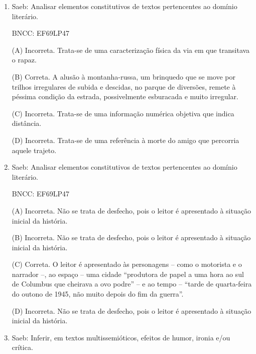 \begin{enumerate}
(B) Incorreta. Não há efeito humorístico no texto.

(C) Correta. A expressão ``mostre a língua'' apresenta o sentido literal
de mostrar a língua para aplicação das gotas da vacina, bem como o
sentido figurado de desdenhar da doença.

(D) Incorreta. O texto da campanha apresenta um jogo entre os sentidos
figurado e literal, como na expressão ``mostre a língua''.


\item

Saeb: Analisar elementos constitutivos de textos pertencentes ao domínio
literário.

BNCC: EF69LP47

(A) Incorreta. Trata-se de uma caracterização física da via em que
transitava o rapaz.

(B) Correta. A alusão à montanha-russa, um brinquedo que se move por
trilhos irregulares de subida e descidas, no parque de diversões, remete
à péssima condição da estrada, possivelmente esburacada e muito
irregular.

(C) Incorreta. Trata-se de uma informação numérica objetiva que indica
distância.

(D) Incorreta. Trata-se de uma referência à morte do amigo que percorria
aquele trajeto.


\item

Saeb: Analisar elementos constitutivos de textos pertencentes ao domínio
literário.

BNCC: EF69LP47

(A) Incorreta. Não se trata de desfecho, pois o leitor é apresentado à
situação inicial da história.

(B) Incorreta. Não se trata de desfecho, pois o leitor é apresentado à
situação inicial da história.

(C) Correta. O leitor é apresentado às personagens -- como o motorista e
o narrador --, ao espaço -- uma cidade ``produtora de papel a uma hora
ao sul de Columbus que cheirava a ovo podre'' -- e ao tempo -- ``tarde
de quarta-feira do outono de 1945, não muito depois do fim da guerra''.

(D) Incorreta. Não se trata de desfecho, pois o leitor é apresentado à
situação inicial da história.


\item

Saeb: Inferir, em textos multissemióticos, efeitos de humor, ironia e/ou
crítica.


\end{enumerate}
